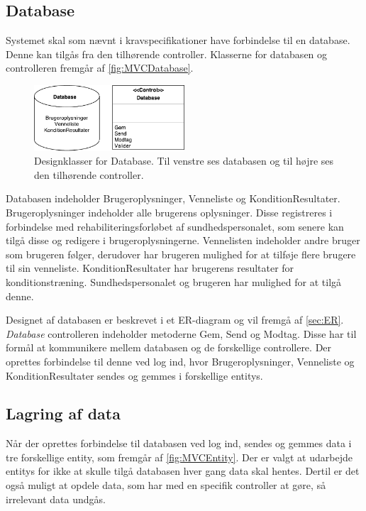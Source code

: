 \subsection*{Database}
Systemet skal som nævnt i kravspecifikationer have forbindelse til en database. Denne kan tilgås fra den tilhørende controller. Klasserne for databasen og controlleren fremgår af \autoref{fig:MVCDatabase}. 

\begin{figure} [H]
\centering
\includegraphics[width=0.5\textwidth]{figures/MVC/MVCDatabase}
\caption{Designklasser for Database. Til venstre ses databasen og til højre ses den tilhørende controller.}
\label{fig:MVCDatabase}
\end{figure}

\noindent
Databasen indeholder Brugeroplysninger, Venneliste og KonditionResultater. Brugeroplysninger indeholder alle brugerens oplysninger. Disse registreres i forbindelse med rehabiliteringsforløbet af sundhedspersonalet, som senere kan tilgå disse og redigere i brugeroplysningerne. Vennelisten indeholder andre bruger som brugeren følger, derudover har brugeren mulighed for at tilføje flere brugere til sin venneliste. KonditionResultater har brugerens resultater for konditionstræning. Sundhedspersonalet og brugeren har mulighed for at tilgå denne. 

Designet af databasen er beskrevet i et ER-diagram og vil fremgå af \autoref{sec:ER}. \textit{Database} controlleren indeholder metoderne Gem, Send og Modtag. Disse har til formål at kommunikere mellem databasen og de forskellige controllere. Der oprettes forbindelse til denne ved log ind, hvor Brugeroplysninger, Venneliste og KonditionResultater sendes og gemmes i forskellige entitys.

\subsection*{Lagring af data}  \label{sec:entity}
Når der oprettes forbindelse til databasen ved log ind, sendes og gemmes data i tre forskellige entity, som fremgår af \autoref{fig:MVCEntity}. Der er valgt at udarbejde entitys for ikke at skulle tilgå databasen hver gang data skal hentes. Dertil er det også muligt at opdele data, som har med en specifik controller at gøre, så irrelevant data undgås. 

